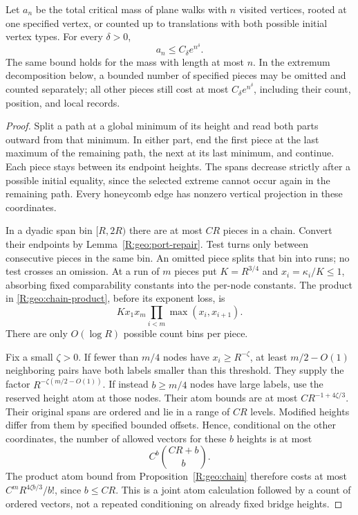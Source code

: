 \begin{proposition}\label{R:geo:absolute-count}
Let $a_n$ be the total critical mass of plane walks with $n$ visited
vertices, rooted at one specified vertex, or counted up to translations
with both possible initial vertex types.  For every $\delta>0$,
\[
                         a_n\le C_\delta e^{n^\delta}.
\]
The same bound holds for the mass with length at most $n$.  In the
extremum decomposition below, a bounded number of specified pieces may
be omitted and counted separately; all other pieces still cost at most
$C_\delta e^{n^\delta}$, including their count, position, and local
records.
\end{proposition}
\begin{proof}
Split a path at a global minimum of its height and read both parts
outward from that minimum.  In either part, end the first piece at the
last maximum of the remaining path, the next at its last minimum, and
continue.  Each piece stays between its endpoint heights.  The spans
decrease strictly after a possible initial equality, since the selected
extreme cannot occur again in the remaining path.  Every honeycomb edge
has nonzero vertical projection in these coordinates.

In a dyadic span bin $[R,2R)$ there are at most $CR$ pieces in a chain.
Convert their endpoints by Lemma~\ref{R:geo:port-repair}.  Test turns
only between consecutive pieces in the same bin.  An omitted piece
splits that bin into runs; no test crosses an omission.  At a run of
$m$ pieces put $K=R^{3/4}$ and $x_i=\kappa_i/K\le1$, absorbing
fixed comparability constants into the per-node constants.  The product
in \eqref{R:geo:chain-product}, before its exponent loss, is
\begin{equation}\label{R:geo:run-product}
            Kx_1x_m\prod_{i<m}\max(x_i,x_{i+1}).
\end{equation}
There are only $O(\log R)$ possible count bins per piece.

Fix a small $\zeta>0$.  If fewer than $m/4$ nodes have
$x_i\ge R^{-\zeta}$, at least $m/2-O(1)$ neighboring pairs have
both labels smaller than this threshold.  They supply the factor
$R^{-\zeta(m/2-O(1))}$.  If instead $b\ge m/4$ nodes have large
labels, use the reserved height atom at those nodes.  Their atom bounds
are at most $C R^{-1+4\zeta/3}$.  Their original spans are ordered
and lie in a range of $CR$ levels.  Modified heights differ from them
by specified bounded offsets.  Hence, conditional on the other
coordinates, the number of allowed vectors for these $b$ heights is
at most
\[
                    C^b\binom{CR+b}{b}.
\]
The product atom bound from Proposition~\ref{R:geo:chain} therefore
costs at most $C^mR^{4\zeta b/3}/b!$, since $b\le CR$.
This is a joint atom calculation followed by a count of ordered vectors,
not a repeated conditioning on already fixed bridge heights.


\end{proof}
